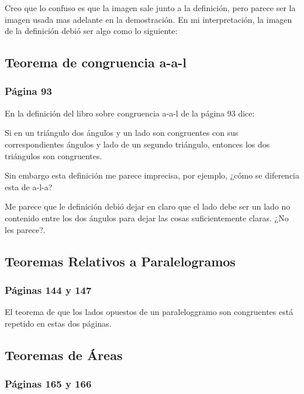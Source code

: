 Creo que lo confuso es que la imagen sale junto a la definición, pero parece ser la imagen usada mas adelante en la demostración. En mi interpretación, la imagen de la definición debió ser algo como lo siguiente:

\begin{figure}[!h]
    \centering
    
    \label{fig:interior-exterior-angles}
\end{figure}

\subsection{Teorema de congruencia a-a-l}
\subsubsection{Página 93}

En la definición del libro sobre congruencia a-a-l de la página 93 dice:

Si en un triángulo dos ángulos y un lado son congruentes con sus correspondientes ángulos y lado de un segundo triángulo, entonces los dos triángulos son congruentes.

Sin embargo esta definición me parece imprecisa, por ejemplo, ¿cómo se diferencia esta de a-l-a?

Me parece que le definición debió dejar en claro que el lado debe ser un lado no contenido entre los dos ángulos para dejar las cosas suficientemente claras. ¿No les parece?.

\subsection{Teoremas Relativos a Paralelogramos}
\subsubsection{Páginas 144 y 147}

El teorema de que los lados opuestos de un paraleloggramo son congruentes está repetido en estas dos páginas.

\subsection{Teoremas de Áreas}
\subsubsection{Páginas 165 y 166}

